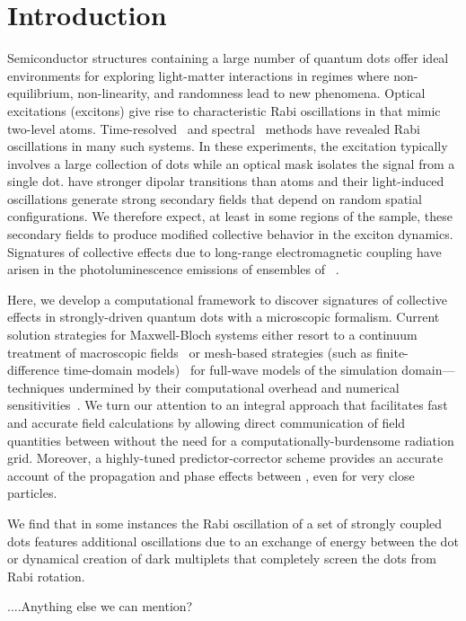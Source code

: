\section{\label{sec:introduction}Introduction}
Semiconductor structures containing a large number of quantum dots offer ideal environments for exploring light-matter interactions in regimes where non-equilibrium, non-linearity, and randomness lead to new phenomena.
Optical excitations (excitons) give rise to characteristic Rabi oscillations in \qds{} that mimic two-level atoms.
Time-resolved~\cite{stievater,shih} and spectral~\cite{kamada} methods have revealed Rabi oscillations in many such systems.
In these experiments, the excitation typically involves a large collection of dots while an optical mask isolates the signal from a single dot.
\Qds{} have stronger dipolar transitions than atoms and their light-induced oscillations generate strong secondary fields that depend on random spatial configurations.
We therefore expect, at least in some regions of the sample, these secondary fields to produce modified collective behavior in the exciton dynamics.
Signatures of collective effects due to long-range electromagnetic coupling have arisen in the photoluminescence emissions of ensembles of \qds{}~\cite{forchel}.

Here, we develop a computational framework to discover signatures of collective effects in strongly-driven quantum dots with a microscopic formalism.
Current solution strategies for Maxwell-Bloch systems either resort to a continuum treatment of macroscopic fields~\cite{} or mesh-based strategies (such as finite-difference time-domain models)~\cite{Vanneste2001, Fratalocchi2008} for full-wave models of the simulation domain---techniques undermined by their computational overhead and numerical sensitivities~\cite{Baczewski2013}.
We turn our attention to an integral approach that facilitates fast and accurate field calculations by allowing direct communication of field quantities between \qds{} without the need for a computationally-burdensome radiation grid.
Moreover, a highly-tuned predictor-corrector scheme provides an accurate account of the propagation and phase effects between \qds{}, even for very close particles.

We find that in some instances the Rabi oscillation of a set of strongly coupled dots features additional oscillations due to an exchange of energy between the dot or dynamical creation of dark multiplets that completely screen the dots from Rabi rotation.


....Anything else we can mention?

